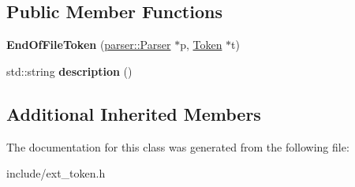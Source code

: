 \subsection*{Public Member Functions}
\begin{DoxyCompactItemize}
\item 
{\bfseries End\+Of\+File\+Token} (\hyperlink{classfcal_1_1parser_1_1Parser}{parser\+::\+Parser} $\ast$p, \hyperlink{classfcal_1_1scanner_1_1Token}{Token} $\ast$t)\hypertarget{classfcal_1_1scanner_1_1EndOfFileToken_a275106595ca3f5a46c80efb281021f2b}{}\label{classfcal_1_1scanner_1_1EndOfFileToken_a275106595ca3f5a46c80efb281021f2b}

\item 
std\+::string {\bfseries description} ()\hypertarget{classfcal_1_1scanner_1_1EndOfFileToken_a8fdfe21df812622405e5b7814970f367}{}\label{classfcal_1_1scanner_1_1EndOfFileToken_a8fdfe21df812622405e5b7814970f367}

\end{DoxyCompactItemize}
\subsection*{Additional Inherited Members}


The documentation for this class was generated from the following file\+:\begin{DoxyCompactItemize}
\item 
include/ext\+\_\+token.\+h\end{DoxyCompactItemize}
